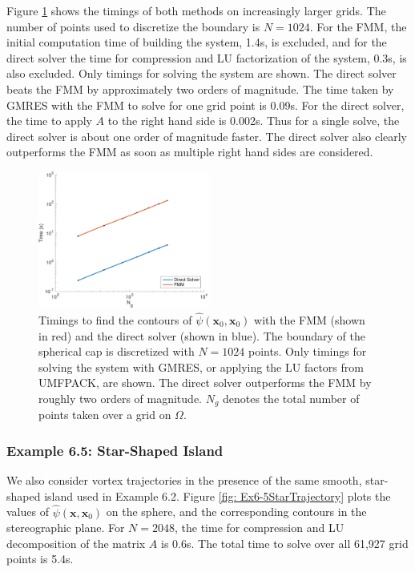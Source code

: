 \documentclass{sfuthesis}
\begin{document}
Figure \ref{fig: Ex6-4FMMVsDirect} shows the timings of both methods on increasingly larger grids. The number of points used to discretize the boundary is $N=1024$. For the FMM, the initial computation time of building the system, 1.4s, is excluded, and for the direct solver the time for compression and LU factorization of the system, 0.3s, is also excluded. Only timings for solving the system are shown. The direct solver beats the FMM by approximately two orders of magnitude. The time taken by GMRES with the FMM to solve for one grid point is 0.09s. For the direct solver, the time to apply $A$ to the right hand side is 0.002s. Thus for a single solve, the direct solver is about one order of magnitude faster. The direct solver also clearly outperforms the FMM as soon as multiple right hand sides are considered. 

\begin{figure}[h]
	\centering
	\includegraphics[width=0.5\textwidth]{Ex6-4FMMVsDirect}
	\caption{Timings to find the contours of $\hat{\psi}(\mathbf{x}_0, \mathbf{x}_0)$ with the FMM (shown in red) and the direct solver (shown in blue). The boundary of the spherical cap is discretized with $N=1024$ points. Only timings for solving the system with GMRES, or applying the LU factors from UMFPACK, are shown. The direct solver outperforms the FMM by roughly two orders of magnitude. $N_g$ denotes the total number of points taken over a grid on $\Omega$.}
	\label{fig: Ex6-4FMMVsDirect}
\end{figure}


\subsubsection{Example 6.5: Star-Shaped Island}
We also consider vortex trajectories in the presence of the same smooth, star-shaped island used in Example 6.2. Figure \ref{fig: Ex6-5StarTrajectory} plots the values of $\hat{\psi}(\mathbf{x}, \mathbf{x}_0)$ on the sphere, and the corresponding contours in the stereographic plane. For $N=2048$, the time for compression and LU decomposition of the matrix $A$ is  0.6s. The total time to solve over all 61,927 grid points is 5.4s. 
\end{document}
